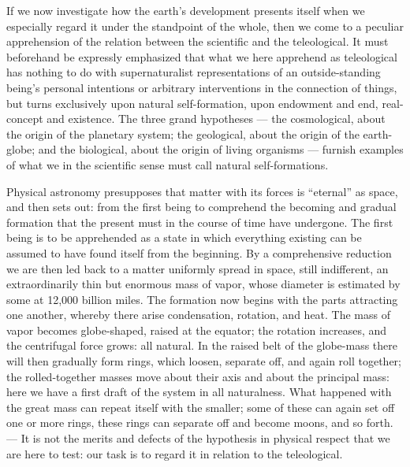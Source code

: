 \documentclass[12pt]{book}
\begin{document}
If we now investigate how the earth's development presents itself when we especially
regard it under the standpoint of the whole, then we come to a peculiar apprehension of
the relation between the scientific and the teleological. It must beforehand be expressly
emphasized that what we here apprehend as teleological has nothing to do with
supernaturalist representations of an outside-standing being's personal intentions or
arbitrary interventions in the connection of things, but turns exclusively upon natural
self-formation, upon endowment and end, real-concept and existence. The three grand
hypotheses --- the cosmological, about the origin of the planetary system; the geological,
about the origin of the earth-globe; and the biological, about the origin of living
organisms --- furnish examples of what we in the scientific sense must call natural
self-formations.

Physical astronomy presupposes that matter with its forces is ``eternal'' as space, and
then sets out: from the first being to comprehend the becoming and gradual formation that
the present must in the course of time have undergone. The first being is to be apprehended
as a state in which everything existing can be assumed to have found itself from the
beginning. By a comprehensive reduction we are then led back to a matter uniformly spread
in space, still indifferent, an extraordinarily thin but enormous mass of vapor, whose
diameter is estimated by some at 12,000 billion miles. The formation now begins with the
parts attracting one another, whereby there arise condensation, rotation, and heat. The
mass of vapor becomes globe-shaped, raised at the equator; the rotation increases, and the
centrifugal force grows: all natural. In the raised belt of the globe-mass there will then
gradually form rings, which loosen, separate off, and again roll together; the
rolled-together masses move about their axis and about the principal mass: here we have a
first draft of the system in all naturalness. What happened with the great mass can repeat
itself with the smaller; some of these can again set off one or more rings, these rings can
separate off and become moons, and so forth. --- It is not the merits and defects of the
hypothesis in physical respect that we are here to test: our task is to regard it in
relation to the teleological.
\end{document}
